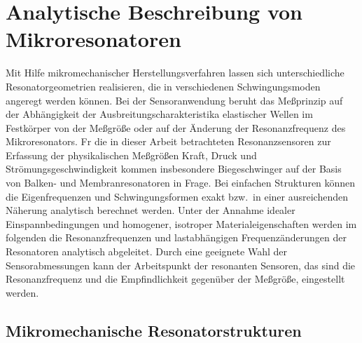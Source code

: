 \section[Analytische Beschreibungsweise]
{Analytische Beschreibung von Mikroresonatoren}
\label{analytischebeschreibungsweise}

Mit Hilfe mikromechanischer Herstellungsverfahren lassen sich
unterschiedliche Resonatorgeometrien realisieren, die in verschiedenen
Schwingungsmoden angeregt werden können. Bei der Sensoranwendung
beruht das Meßprinzip auf der Abhängigkeit der
Ausbreitungscharakteristika elastischer Wellen im Festkörper von
der Meßgröße oder auf der Änderung der Resonanzfrequenz des Mikroresonators.
Fr die in dieser Arbeit betrachteten Resonanzsensoren zur Erfassung der
physikalischen Meßgrößen Kraft, Druck und Strömungsgeschwindigkeit kommen
insbesondere Biegeschwinger auf der Basis von Balken- und
Membranresonatoren in Frage. Bei
einfachen Strukturen können die Eigenfrequenzen und Schwingungsformen
exakt bzw.\ in einer ausreichenden Näherung analytisch berechnet
werden. Unter der
Annahme idealer Einspannbedingungen und homogener, isotroper
Materialeigenschaften werden im folgenden die Resonanzfrequenzen und
lastabhängigen Frequenzänderungen der Resonatoren analytisch abgeleitet.
Durch eine geeignete Wahl der Sensorabmessungen kann der Arbeitspunkt der
resonanten Sensoren, das sind die Resonanzfrequenz und die
Empfindlichkeit gegenüber der Meßgröße, eingestellt werden.


\subsection{Mikromechanische Resonatorstrukturen}
\label{resonatorstrukturen}

